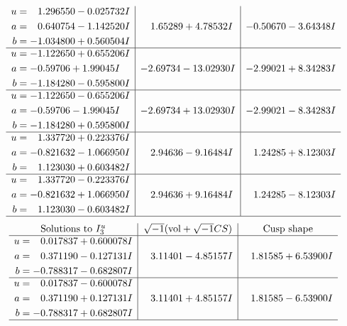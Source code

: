 \documentclass[1p]{elsarticle_modified}
\theoremstyle{definition}
\newcommand{\I}{\sqrt{-1}}
\begin{document}
$$\begin{array}{c|c|c}
\begin{aligned}
u &= \phantom{-}1.296550 - 0.025732 I \\
a &= \phantom{-}0.640754 - 1.142520 I \\
b &= -1.034800 + 0.560504 I\end{aligned}
 & \phantom{-}1.65289 + 4.78532 I & -0.50670 - 3.64348 I \\ \hline\begin{aligned}
u &= -1.122650 + 0.655206 I \\
a &= -0.59706 + 1.99045 I \\
b &= -1.184280 - 0.595800 I\end{aligned}
 & -2.69734 - 13.02930 I & -2.99021 + 8.34283 I \\ \hline\begin{aligned}
u &= -1.122650 - 0.655206 I \\
a &= -0.59706 - 1.99045 I \\
b &= -1.184280 + 0.595800 I\end{aligned}
 & -2.69734 + 13.02930 I & -2.99021 - 8.34283 I \\ \hline\begin{aligned}
u &= \phantom{-}1.337720 + 0.223376 I \\
a &= -0.821632 - 1.066950 I \\
b &= \phantom{-}1.123030 + 0.603482 I\end{aligned}
 & \phantom{-}2.94636 - 9.16484 I & \phantom{-}1.24285 + 8.12303 I \\ \hline\begin{aligned}
u &= \phantom{-}1.337720 - 0.223376 I \\
a &= -0.821632 + 1.066950 I \\
b &= \phantom{-}1.123030 - 0.603482 I\end{aligned}
 & \phantom{-}2.94636 + 9.16484 I & \phantom{-}1.24285 - 8.12303 I\\
 \hline 
 \end{array}$$\newpage$$\begin{array}{c|c|c}  
\text{Solutions to }I^u_{3}& \I (\text{vol} + \sqrt{-1}CS) & \text{Cusp shape}\\
 \hline 
\begin{aligned}
u &= \phantom{-}0.017837 + 0.600078 I \\
a &= \phantom{-}0.371190 - 0.127131 I \\
b &= -0.788317 - 0.682807 I\end{aligned}
 & \phantom{-}3.11401 - 4.85157 I & \phantom{-}1.81585 + 6.53900 I \\ \hline\begin{aligned}
u &= \phantom{-}0.017837 - 0.600078 I \\
a &= \phantom{-}0.371190 + 0.127131 I \\
b &= -0.788317 + 0.682807 I\end{aligned}
 & \phantom{-}3.11401 + 4.85157 I & \phantom{-}1.81585 - 6.53900 I\\
 \hline 
 \end{array}$$\newpage\newpage\renewcommand{\arraystretch}{1}
\end{document}
